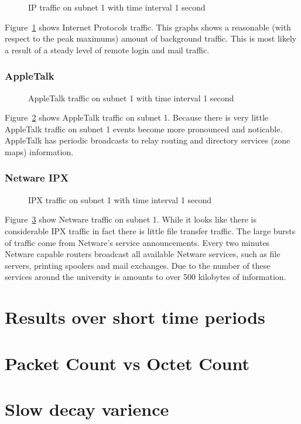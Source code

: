\begin{figure}
\leavevmode
\epsfysize=3in
\caption{IP traffic on subnet 1 with time interval 1 second}
\label{simple:snet1.ip.1s.freq}
\end{figure}

Figure~\ref{simple:snet1.ip.1s.freq} shows Internet Protocols traffic.
This graphs shows a reasonable (with respect to the peak maximums)
amount of background traffic.  This is most likely a result of a
steady level of remote login and mail traffic.

\subsubsection{AppleTalk}

\begin{figure}
\leavevmode
\epsfysize=3in
\caption{AppleTalk traffic on subnet 1 with time interval 1 second}
\label{simple:snet1.apt.1s.freq}
\end{figure}

Figure~\ref{simple:snet1.apt.1s.freq} shows AppleTalk traffic on
subnet 1.  Because there is very little AppleTalk traffic on subnet 1
events become more pronounced and noticable.  AppleTalk has periodic
broadcasts to relay routing and directory services (zone maps)
information.

\subsubsection{Netware IPX}

\begin{figure}
\leavevmode
\epsfysize=3in
\caption{IPX traffic on subnet 1 with time interval 1 second}
\label{simple:snet1.nov.1s.freq}
\end{figure}

Figure~\ref{simple:snet1.nov.1s.freq} show Netware traffic on subnet 1.
While it looks like there is considerable IPX traffic in fact there is
little file transfer traffic.  The large bursts of traffic come from
Netware's service announcements.  Every two minutes Netware capable
routers broadcast all available Netware services, such as file
servers, printing spoolers and mail exchanges.  Due to the number of
these services around the university is amounts to over 500 kilobytes
of information.

\section{Results over short time periods}

\section{Packet Count vs Octet Count}

\section{Slow decay varience}

